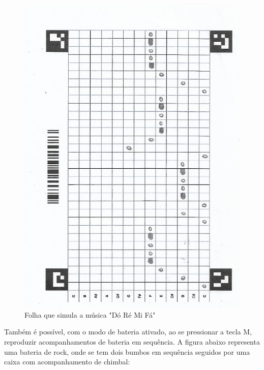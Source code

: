 \documentclass[12pt]{report}
\begin{document}
{\begin{figure}[H]
  \centering
  \includegraphics[angle=270,origin=c,width=1\textwidth]{imagens/doremifa.jpeg}
  \caption{Folha que simula a música "Dó Ré Mi Fá"}
  \label{fig:doremifa}
\end{figure}

Também é possível, com o modo de bateria ativado, ao se pressionar a tecla M, reproduzir acompanhamentos de bateria em sequência. A figura abaixo representa uma bateria de rock, onde se tem dois bumbos em sequência seguidos por uma caixa com acompanhamento de chimbal:

}
\end{document}
